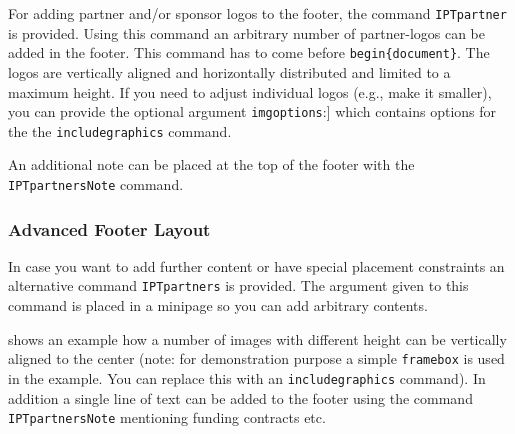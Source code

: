 


For adding partner and/or sponsor logos to the footer, the command \texttt{\bs{}IPTpartner} is provided. Using this command an arbitrary number of partner-logos can be added in the footer. This command has to come before \texttt{\bs{}begin\{document\}}. The logos are vertically aligned and horizontally distributed and limited to a maximum height. If you need to adjust individual logos (e.g., make it smaller), you can provide the optional argument \texttt{imgoptions}:] which contains options for the the \texttt{\bs{}includegraphics} command.

An additional note can be placed at the top of the footer with the \texttt{\bs{}IPTpartnersNote} command.



\subsubsection{Advanced Footer Layout}

In case you want to add further content or have special placement constraints an alternative command \texttt{\bs{}IPTpartners} is provided. The argument given to this command is placed in a minipage so you can add arbitrary contents. 

 shows an example how a number of images with different height can be vertically aligned to the center (note: for demonstration purpose a simple \texttt{\bs{}framebox} is used in the example. You can replace this with an \texttt{\bs{}includegraphics} command).
In addition a single line of text can be added to the footer using the command \texttt{\bs{}IPTpartnersNote} mentioning funding contracts etc.

